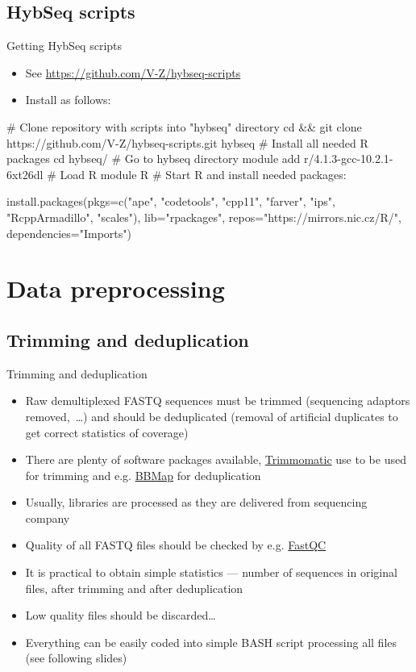 \documentclass[compress, ucs, xelatex, 11pt, xcolor=x11names, aspectratio=169,
	hyperref={
		bookmarks=true,
		unicode=true,
		colorlinks=true,
		pdftitle={HybSeq course},
		plainpages=false,
		pdfauthor={Vojtech Zeisek},
		pdfsubject={Practical processing of HybSeq target enrichment sequencing data on computing grids like MetaCentrum},
		pdfcreator={XeLaTeX},
		pdfkeywords={BASH, command line, GNU, HybSeq, Linux, MetaCentrum, sequencing shell, target enrichment},
		linkcolor=Turquoise4, %
		anchorcolor=DodgerBlue4, %
		citecolor=DodgerBlue4, %
		filecolor=DodgerBlue4, %
		menucolor=Tan4, %
		urlcolor=DarkOliveGreen4, %
		pdftex},
	url={hyphens, lowtilde} %
	]{beamer}
\begin{document}
\subsection{HybSeq scripts}

\begin{frame}[fragile]{Getting HybSeq scripts}
	\begin{itemize}
		\item See \url{https://github.com/V-Z/hybseq-scripts}
		\item Install as follows:
	\end{itemize}
	\begin{bashcode}
    # Clone repository with scripts into "hybseq" directory
    cd && git clone https://github.com/V-Z/hybseq-scripts.git hybseq
    # Install all needed R packages
    cd hybseq/ # Go to hybseq directory
    module add r/4.1.3-gcc-10.2.1-6xt26dl # Load R module
    R # Start R and install needed packages:
	\end{bashcode}
	\begin{spluscode}
    install.packages(pkgs=c("ape", "codetools", "cpp11", "farver",
      "ips", "RcppArmadillo", "scales"), lib="rpackages",
      repos="https://mirrors.nic.cz/R/", dependencies="Imports")
	\end{spluscode}
\end{frame}

\section{Data preprocessing}

\subsection{Trimming and deduplication}

\begin{frame}{Trimming and deduplication}
	\begin{itemize}
		\item Raw demultiplexed FASTQ sequences must be trimmed (sequencing adaptors removed,~\ldots) and should be deduplicated (removal of artificial duplicates to get correct statistics of coverage)
		\item There are plenty of software packages available, \href{http://www.usadellab.org/cms/?page=trimmomatic}{Trimmomatic} use to be used for trimming and e.g. \href{https://sourceforge.net/projects/bbmap/}{BBMap} for deduplication
		\item Usually, libraries are processed as they are delivered from sequencing company
		\item Quality of all FASTQ files should be checked by e.g. \href{https://www.bioinformatics.babraham.ac.uk/projects/fastqc/}{FastQC}
		\item It is practical to obtain simple statistics --- number of sequences in original files, after trimming and after deduplication
		\item Low quality files should be discarded\ldots
		\item Everything can be easily coded into simple BASH script processing all files (see following slides)
	\end{itemize}
\end{frame}
\end{document}

